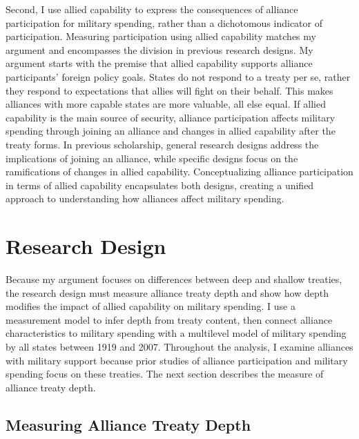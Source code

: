 \documentclass[12pt]{article}
\begin{document}
Second, I use allied capability to express the consequences of alliance participation for military spending, rather than a dichotomous indicator of participation.
Measuring participation using allied capability matches my argument and encompasses the division in  previous research designs. 
My argument starts with the premise that allied capability supports alliance participants' foreign policy goals. 
States do not respond to a treaty per se, rather they respond to expectations that allies will fight on their behalf.
This makes alliances with more capable states are more valuable, all else equal.
If allied capability is the main source of security, alliance participation affects military spending through joining an alliance and changes in allied capability after the treaty forms. 
In previous scholarship, general research designs address the implications of joining an alliance, while specific designs focus on the ramifications of changes in allied capability. 
Conceptualizing alliance participation in terms of allied capability encapsulates both designs, creating a unified approach to understanding how alliances affect military spending. 



\section{Research Design} 


Because my argument focuses on differences between deep and shallow treaties, the research design must measure alliance treaty depth and show how depth modifies the impact of allied capability on military spending.  
I use a measurement model to infer depth from treaty content, then connect alliance characteristics to military spending with a multilevel model of military spending by all states between 1919 and 2007. 
Throughout the analysis, I examine alliances with military support because prior studies of alliance participation and military spending focus on these treaties.
The next section describes the measure of alliance treaty depth. 


\subsection{Measuring Alliance Treaty Depth} 
\end{document}
